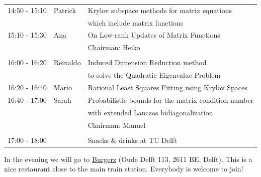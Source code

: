 \documentclass{article}
\begin{document}
\begin{table}[h]
\begin{tabular}{lll}
14:50 - 15:10 & Patrick & Krylov subspace methods for matrix equations \\
                  & & which include matrix functions\\ [0.5ex]
15:10 - 15:30 & Ana & On Low-rank Updates of Matrix Functions\\ [0.5ex]
& & \hfill \small{Chairman: Heiko}  \\
\hline \\ [-1.5ex]
16:00 - 16:20 & Reinaldo & Induced Dimension Reduction method \\
            & & to solve the Quadratic Eigenvalue Problem \\ [0.5ex]
16:20 - 16:40 & Mario & Rational Least Squares Fitting using Krylov Spaces\\ [0.5ex]
16:40 - 17:00 & Sarah & Probabilistic bounds for the matrix condition number \\
                    & & with extended Lanczos bidiagonalization\\ [0.5ex]
& & \hfill \small{Chairman: Manuel}\\
\hline \\ [-1.5ex]
17:00 - 18:00 & & Snacks \& drinks at TU Delft
\end{tabular}
\end{table}

In the evening we will go to \href{http://www.burgerz.nl/en/contact/delft}{Burgerz} (Oude Delft 113, 2611 BE, Delft). This is a nice restaurant close to the main train station. Everybody is welcome to join!
\end{document}
